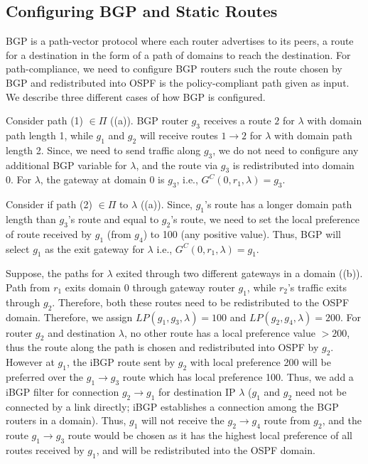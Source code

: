 \subsection{Configuring BGP and Static Routes}
BGP is a path-vector protocol where each router 
advertises to its peers, 
a route for a destination in the form 
of a path of domains to reach the destination.  
For path-compliance, we need to configure
BGP routers such the route chosen by BGP
and redistributed into OSPF is the policy-compliant
path given as input. We describe three different
cases of how BGP is configured.  

Consider path (1) $\in \Pi$ ((a)).
BGP router $g_3$ receives a route $2$ for $\lambda$ with domain path length 1, 
while $g_1$ and $g_2$ will receive routes $1 \rightarrow 2$ 
for $\lambda$ with 
domain path length 2. Since, we need to send traffic along
$g_3$, we do not need to configure any additional BGP variable for $\lambda$,
and the route via $g_3$ is redistributed into domain 0. 
For $\lambda$, the gateway at domain 0 is $g_3$, i.e.,
$G^C(0, r_1, \lambda) = g_3$.

Consider if path (2) $\in \Pi$ to $\lambda$ 
((a)). Since, $g_1$'s route has a longer domain 
path length than $g_3$'s route and equal to $g_2$'s route,
we need to set the local preference of route received by $g_1$ 
(from $g_4$) to 100 (any positive value). Thus, BGP 
will select $g_1$ as the exit gateway for $\lambda$ i.e.,
$G^C(0, r_1, \lambda) = g_1$.

Suppose, the paths for $\lambda$ exited through two different
gateways in a domain ((b)).
Path from $r_1$ exits domain 0 through 
gateway router $g_1$, while $r_2$'s traffic exits 
through $g_2$. 
Therefore, both these routes need to be 
redistributed to the OSPF domain. 
Therefore, we assign
$LP(g_1,g_3,\lambda) = 100$ and $LP(g_2,g_4,\lambda) = 200$. For 
router $g_2$ and destination $\lambda$, 
no other route has a local preference value $>200$, thus 
the route along the path is chosen and redistributed into 
OSPF by $g_2$. However at $g_1$, the iBGP route
sent by $g_2$ with local preference 200 will be preferred over
the $g_1\rightarrow g_3$ route which has local preference 100.
Thus, we add a iBGP filter for connection $g_2 \rightarrow g_1$ for
destination IP $\lambda$ ($g_1$ and $g_2$ need not be connected by a 
link directly; iBGP establishes a connection among the 
BGP routers in a domain). Thus, $g_1$ will not receive the
$g_2 \rightarrow g_4$ route from $g_2$, and the route $g_1 \rightarrow
g_3$ route would be chosen as it has the highest local preference
of all routes received by $g_1$, and will be redistributed into the 
OSPF domain. 

